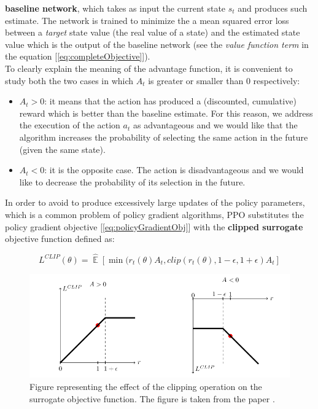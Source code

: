 \documentclass{article}
\DeclareMathOperator{\EX}{\mathbb{E}}%
\begin{document}
\textbf{baseline network}, which takes as input the current state \(s_{t}\) and produces such estimate. The network is trained to minimize the a mean squared error loss between a \textit{target} state value (the real value of a state) and the estimated state value which is the output of the baseline network (see the \textit{value function term} in the equation [\ref{eq:completeObjective}]).\\ 
To clearly explain the meaning of the advantage function, it is convenient to study both the two cases in which \(A_{t}\) is greater or smaller than 0 respectively:
\begin{itemize}
\item \(A_{t}>0\): it means that the action has produced a (discounted, cumulative) reward which is better than the baseline estimate. For this reason, we address the execution of the action \(a_{t}\) as advantageous and we would like that the algorithm increases the probability of selecting the same action in the future (given the same state).
\item \(A_{t}<0\): it is the opposite case. The action is disadvantageous and we would like to decrease the probability of its selection in the future.
\end{itemize}
In order to avoid to produce excessively large updates of the policy parameters, which is a common problem of policy gradient algorithms, PPO substitutes the policy gradient objective [\ref{eq:policyGradientObj}] with the \textbf{clipped surrogate} objective function defined as:

\begin{equation}\label{eq:clippedSurrogateObjective}
L^{CLIP}(\theta) = \hat{\EX}[\min(r_{t}(\theta)A_{t}, clip(r_{t}(\theta),1-\epsilon,1+\epsilon)A_{t}]
\end{equation}

\begin{figure}
    \centering
    \includegraphics[width = \textwidth]{images/L_clip_image.png}
    \caption{Figure representing the effect of the clipping operation on the surrogate objective function. The figure is taken from the paper \cite{schulman2017proximal_PPO}.}
    \label{fig:ClippingObjective}
\end{figure}
\end{document}

